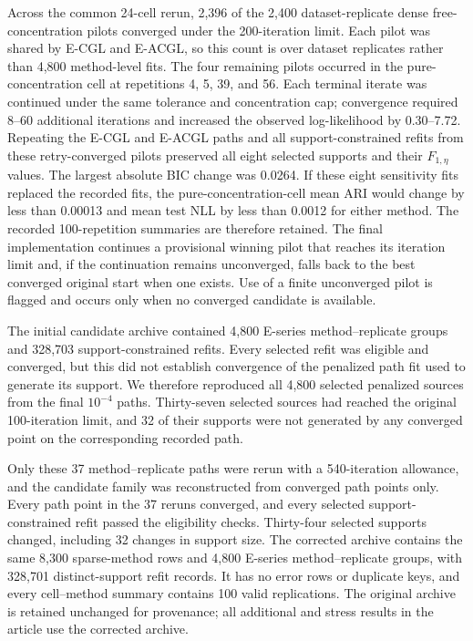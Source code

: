 \documentclass[preprint,12pt,authoryear]{elsarticle}
\begin{document}
Across the common 24-cell rerun, 2,396 of the 2,400 dataset-replicate dense
free-concentration pilots converged under the 200-iteration limit. Each pilot
was shared by E-CGL and E-ACGL, so this count is over dataset replicates rather
than 4,800 method-level fits. The four
remaining pilots occurred in the
pure-concentration cell at repetitions 4, 5, 39, and 56. Each terminal iterate
was continued under the same tolerance and concentration cap; convergence
required 8--60 additional iterations and increased the observed
log-likelihood by 0.30--7.72. Repeating the E-CGL and E-ACGL paths and all
support-constrained refits from these retry-converged pilots preserved all
eight selected supports and their $F_{1,\eta}$ values. The largest absolute
BIC change was 0.0264. If these eight sensitivity fits replaced the recorded
fits, the pure-concentration-cell mean ARI would change by less than 0.00013
and mean test NLL by less than 0.0012 for either method. The recorded
100-repetition summaries are therefore retained. The final implementation
continues a provisional winning pilot that reaches its iteration limit and,
if the continuation remains unconverged, falls back to the best converged
original start when one exists. Use of a finite unconverged pilot is flagged
and occurs only when no converged candidate is available.

The initial candidate archive contained 4,800 E-series method--replicate groups
and 328,703 support-constrained refits. Every selected refit was eligible and
converged, but this did not establish convergence of the penalized path fit
used to generate its support. We therefore reproduced all 4,800 selected
penalized sources from the final $10^{-4}$ paths. Thirty-seven selected sources
had reached the original 100-iteration limit, and 32 of their supports were
not generated by any converged point on the corresponding recorded path.

Only these 37 method--replicate paths were rerun with a 540-iteration allowance,
and the candidate family was reconstructed from converged path points only.
Every path point in the 37 reruns converged, and every selected
support-constrained refit passed the eligibility checks. Thirty-four selected
supports changed, including 32 changes in support size. The corrected archive
contains the same 8,300 sparse-method rows and 4,800 E-series
method--replicate groups, with 328,701 distinct-support refit records. It has no
error rows or duplicate keys, and every cell--method summary contains 100 valid
replications. The original archive is retained unchanged for provenance; all
additional and stress results in the article use the corrected archive.
\end{document}
